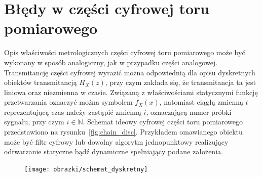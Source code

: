 \section{Błędy w części cyfrowej toru pomiarowego}

Opis właściwości metrologicznych części cyfrowej toru pomiarowego może być wykonany w sposób analogiczny, jak w przypadku części analogowej. Transmitancję części cyfrowej wyrazić można odpowiednią dla opisu dyskretnych obiektów transmitancją $H_{X}(z)$, przy czym zakłada się, że transmitancja ta jest liniowa oraz niezmienna w czasie. Związaną z właściwościami statycznymi funkcję przetwarzania oznaczyć można symbolem $f_{X}(x)$, natomiast ciągłą zmienną $t$ reprezentującą czas należy zastąpić zmienną $i$, oznaczającą numer próbki sygnału, przy czym $i \in \mathbb{N}$. Schemat ideowy cyfrowej części toru pomiarowego przedstawiono na rysunku~\ref{fig:chain_disc}. Przykładem omawianego obiektu może być filtr cyfrowy lub dowolny algorytm jednopunktowy realizujący odtwarzanie statyczne bądź dynamiczne spełniający podane założenia.

\begin{figure}[htb!]
\begin{center}
\texttt{[image: obrazki/schemat\_dyskretny]}
\end{center}
\end{figure}

